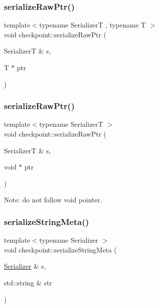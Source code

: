 \mbox{\label{namespacecheckpoint_a6113644a35f5023a57e2ed3ca4814490}} 
\subsubsection{\texorpdfstring{serialize\+Raw\+Ptr()}{serializeRawPtr()}\hspace{0.1cm}{\footnotesize\ttfamily [1/2]}}
{\footnotesize\ttfamily template$<$typename SerializerT , typename T $>$ \\
void checkpoint\+::serialize\+Raw\+Ptr (\begin{DoxyParamCaption}\item[{SerializerT \&}]{s,  }\item[{T $\ast$}]{ptr }\end{DoxyParamCaption})}

\mbox{\label{namespacecheckpoint_aaadeb0ab61d069afc8a97ec6b6dc630c}} 
\subsubsection{\texorpdfstring{serialize\+Raw\+Ptr()}{serializeRawPtr()}\hspace{0.1cm}{\footnotesize\ttfamily [2/2]}}
{\footnotesize\ttfamily template$<$typename SerializerT $>$ \\
void checkpoint\+::serialize\+Raw\+Ptr (\begin{DoxyParamCaption}\item[{SerializerT \&}]{s,  }\item[{void $\ast$}]{ptr }\end{DoxyParamCaption})}

Note\+: do not follow void pointer. \mbox{\label{namespacecheckpoint_a1ea8e1ef9d0a10d26df77cb5309435aa}} 
\subsubsection{\texorpdfstring{serialize\+String\+Meta()}{serializeStringMeta()}}
{\footnotesize\ttfamily template$<$typename Serializer $>$ \\
void checkpoint\+::serialize\+String\+Meta (\begin{DoxyParamCaption}\item[{\hyperlink{structcheckpoint_1_1_serializer}{Serializer} \&}]{s,  }\item[{std\+::string \&}]{str }\end{DoxyParamCaption})}

